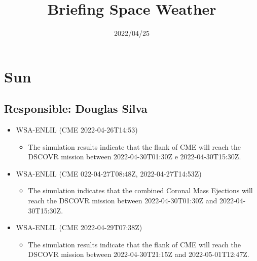 \documentclass[11pt, oneside]{article}
\title{Briefing Space Weather}
\date{2022/04/25}
\begin{document}
\maketitle 

 \section{Sun} 
 \subsection{Responsible: Douglas Silva}

\begin{itemize} 
 \item WSA-ENLIL (CME 2022-04-26T14:53)
\begin{itemize} 
 \item The simulation results indicate that the flank of CME will reach the DSCOVR mission between 2022-04-30T01:30Z e 2022-04-30T15:30Z.
\end{itemize} 
 \item WSA-ENLIL (CME 022-04-27T08:48Z, 2022-04-27T14:53Z)
\begin{itemize} 
 \item The simulation indicates that the combined Coronal Mass Ejections will reach the DSCOVR mission between 2022-04-30T01:30Z and 2022-04-30T15:30Z.
\end{itemize} 
 \item WSA-ENLIL (CME 2022-04-29T07:38Z)
\begin{itemize} 
 \item The simulation results indicate that the flank of CME will reach the DSCOVR mission between 2022-04-30T21:15Z and 2022-05-01T12:47Z. 
\end{itemize} 
 \end{itemize} 
 
\end{document}

